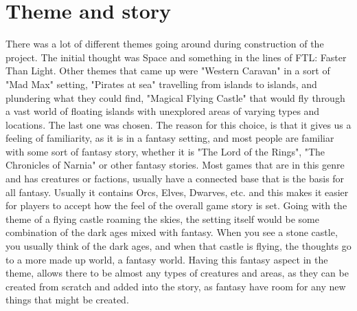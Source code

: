 \section{Theme and story}
There was a lot of different themes going around during construction of the project.
 The initial thought was Space and something in the lines of FTL: Faster Than Light. 
 Other themes that came up were "Western Caravan" in a sort of "Mad Max" setting, "Pirates at sea" travelling 
 from islands to islands, and plundering what they could find, "Magical Flying Castle" that would fly through a 
 vast world of floating islands with unexplored areas of varying types and locations. The last one was chosen. 
 The reason for this choice, is that it gives us a feeling of familiarity, as it is in a fantasy setting,
 and most people are familiar with some sort of fantasy story, whether it is "The Lord of the Rings", 
 "The Chronicles of Narnia" or other fantasy stories. Most games that are in this genre and has creatures or factions, 
 usually have a connected base that is the basis for all fantasy. Usually it contains Orcs, Elves, Dwarves, etc. 
 and this makes it easier for players to accept how the feel of the overall game story is set. 
 Going with the theme of a flying castle roaming the skies, the setting itself would be some combination of the dark ages mixed with fantasy.
 When you see a stone castle, you usually think of the dark ages, and when that castle is flying, the thoughts go to a more made up world,
 a fantasy world. Having this fantasy aspect in the theme, allows there to be almost any types of creatures and areas,
 as they can be created from scratch and added into the story, as fantasy have room for any new things that might be created.
 
